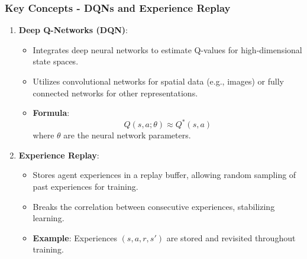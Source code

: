 \documentclass[aspectratio=169]{beamer}
\begin{document}
\begin{frame}[fragile]
    \frametitle{Key Concepts - DQNs and Experience Replay}
    \begin{enumerate}
        \item \textbf{Deep Q-Networks (DQN)}:
        \begin{itemize}
            \item Integrates deep neural networks to estimate Q-values for high-dimensional state spaces.
            \item Utilizes convolutional networks for spatial data (e.g., images) or fully connected networks for other representations.
            \item \textbf{Formula}:
            \begin{equation}
                Q(s, a; \theta) \approx Q^*(s, a)
            \end{equation}
            where \( \theta \) are the neural network parameters.
        \end{itemize}
        
        \item \textbf{Experience Replay}:
        \begin{itemize}
            \item Stores agent experiences in a replay buffer, allowing random sampling of past experiences for training.
            \item Breaks the correlation between consecutive experiences, stabilizing learning.
            \item \textbf{Example}: Experiences \( (s, a, r, s') \) are stored and revisited throughout training.
        \end{itemize}
    \end{enumerate}
\end{frame}
\end{document}
